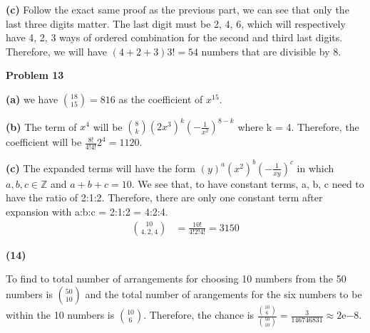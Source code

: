 \documentclass[12pt, letterpaper]{hmcpset}
\begin{document}
\begin{solution}
	\textbf{(c)} Follow the exact same proof as the previous part, we can see that only the last three digits matter. The last digit must be 2, 4, 6, which will respectively have 4, 2, 3 ways of ordered combination for the second and third last digits. Therefore, we will have $(4+2+3)3!=54$ numbers that are divisible by 8. 
\end{solution}

\begin{problem}
	\textbf{Problem 13}
\end{problem}
\begin{solution}
	\textbf{(a)} we have ${{18}\choose{15}} = 816$ as the coefficient of $x^{15}$.
\end{solution}

\begin{solution}
	\textbf{(b)} The term of $x^4$ will be ${{8}\choose{k}}(2x^3)^k(-\frac{1}{x^2})^{8-k}$ where k = 4. Therefore, the coefficient will be $\frac{8!}{4!4!}2^4=1120$.
\end{solution}

\begin{solution}
	\textbf{(c)} The expanded terms will have the form $(y)^a(x^2)^b(-\frac{1}{xy})^c$ in which $a,b,c\in\mathbb{Z}$ and $a+b+c=10$. We see that, to have constant terms, a, b, c need to have the ratio of 2:1:2. Therefore, there are only one constant term after expansion with a:b:c = 2:1:2 = 4:2:4.
	\begin{align*}
		{{10}\choose{4, 2, 4}} &= \frac{10!}{4!2!4!} = 3150
	\end{align*}
\end{solution}

\begin{problem}
	\textbf{(14)}
\end{problem}
\begin{solution}
	To find to total number of arrangements for choosing 10 numbers from the 50 numbers is ${{50}\choose{10}}$ and the total number of arangements for the six numbers to be within the 10 numbers is ${{10}\choose{6}}$. Therefore, the chance is $\frac{{{10}\choose{6}}}{{{50}\choose{10}}}=\frac{3}{146746831}\approx 2\mathrm{e}{-8}$.
\end{solution}
\end{document}
